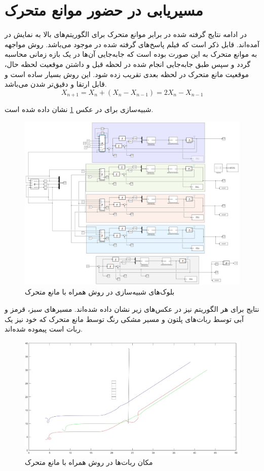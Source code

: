 \newpage
\section{مسیریابی در حضور موانع متحرک}
در ادامه نتایج گرفته شده در برابر موانع متحرک برای الگوریتم‌های بالا به نمایش در آمده‌اند. قابل ذکر است که فیلم پاسخ‌های گرفته شده در \cite{roozbeh2020} موجود می‌باشد. روش مواجهه به موانع متحرک به این صورت بوده است که جابه‌جایی آن‌ها در یک بازه زمانی محاسبه گردد و سپس طبق جابه‌جایی انجام شده در لحظه قبل و داشتن موقعیت لحظه حال، موقعیت مانع متحرک در لحظه بعدی تقریب زده شود. این روش بسیار ساده است و قابل ارتقا و دقیق‌تر شدن می‌باشد.
\begin{equation}
	X_{n+1} = X_n + (X_n - X_{n-1}) = 2X_n - X_{n-1}
\end{equation}

شبیه‌سازی برای  در عکس \ref{Fig dynamic-QL} نشان داده شده است.
\begin{figure}[!h]
	\centering
	\includegraphics[scale=0.25]{Images/dynamic-QL.png}
	\caption{بلوک‌های شبیه‌سازی در روش  همراه با مانع متحرک}\label{Fig dynamic-QL}
\end{figure}

نتایج برای هر الگوریتم نیز در عکس‌های زیر نشان داده شده‌اند. مسیرهای سبز، قرمز و آبی توسط ربات‌های پلتون و مسیر مشکی رنگ توسط مانع متحرک که خود نیز یک ربات است پیموده شده‌اند.
\begin{figure}[!h]
	\centering
	\includegraphics[scale=0.2]{Images/dynamic-QL.jpg}
	\caption{مکان ربات‌ها در روش  همراه با مانع متحرک}
\end{figure}

